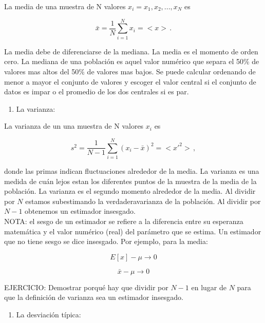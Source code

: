 \documentclass[
]{agujournal2019}
\providecommand{\tightlist}{%
  \setlength{\itemsep}{0pt}\setlength{\parskip}{0pt}}\usepackage{longtable,booktabs,array}
\begin{document}
La media de una muestra de N valores \(x_i=x_1,x_2,...,x_N\) es

\begin{equation}
\bar{x}=\frac{1}{N}\sum^N_{i=1}x_i=<x>\,.
\end{equation}

La media debe de diferenciarse de la mediana. La media es el momento de
orden cero. La mediana de una población es aquel valor numérico que
separa el 50\% de valores mas altos del 50\% de valores mas bajos. Se
puede calcular ordenando de menor a mayor el conjunto de valores y
escoger el valor central si el conjunto de datos es impar o el promedio
de los dos centrales si es par.\\

\begin{enumerate}
\def\labelenumi{\arabic{enumi}.}
\setcounter{enumi}{1}
\tightlist
\item
  La varianza:\\
\end{enumerate}

La varianza de un una muestra de N valores \(x_i\) es

\begin{equation}
s^2=\frac{1}{N-1}\sum^N_{i=1}(x_i-\bar{x})^2=<x'^2>\,,
\end{equation}

donde las primas indican fluctuaciones alrededor de la media. La
varianza es una medida de cuán lejos estan los diferentes puntos de la
muestra de la media de la población. La varianza es el segundo momento
alrededor de la media. Al dividir por \(N\) estamos subestimando la
verdaderavarianza de la población. Al dividir por \(N-1\) obtenemos un
estimador insesgado.\\

NOTA: el sesgo de un estimador se refiere a la diferencia entre su
esperanza matemática y el valor numérico (real) del parámetro que se
estima. Un estimador que no tiene sesgo se dice insesgado. Por ejemplo,
para la media:

\[E[x]-\mu \rightarrow {0}\]

\[\bar{x}-\mu \rightarrow {0}\]

EJERCICIO: Demostrar porqué hay que dividir por \(N-1\) en lugar de
\(N\) para que la definición de varianza sea un estimador insesgado.\\

\begin{enumerate}
\def\labelenumi{\arabic{enumi}.}
\setcounter{enumi}{2}
\tightlist
\item
  La desviación típica:\\
\end{enumerate}
\end{document}
